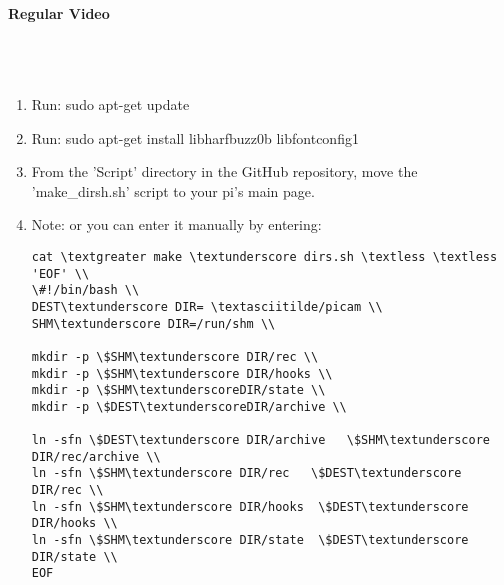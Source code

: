 \documentclass[onecolumn, draftclsnofoot,10pt, compsoc]{IEEEtran}
\begin{document}
\paragraph{Regular Video}\\
\\
\begin{enumerate}
\item  Run: sudo apt-get update
\item  Run: sudo apt-get install libharfbuzz0b libfontconfig1 
\item  From the 'Script' directory in the GitHub repository, move the 'make\_dirsh.sh' script to your pi's main page.
\item  Note: or you can enter it manually by entering: \\
\begin{lstlisting}
cat \textgreater make \textunderscore dirs.sh \textless \textless 'EOF' \\
\#!/bin/bash \\
DEST\textunderscore DIR= \textasciitilde/picam \\
SHM\textunderscore DIR=/run/shm \\

mkdir -p \$SHM\textunderscore DIR/rec \\
mkdir -p \$SHM\textunderscore DIR/hooks \\
mkdir -p \$SHM\textunderscoreDIR/state \\
mkdir -p \$DEST\textunderscoreDIR/archive \\

ln -sfn \$DEST\textunderscore DIR/archive   \$SHM\textunderscore DIR/rec/archive \\
ln -sfn \$SHM\textunderscore DIR/rec   \$DEST\textunderscore DIR/rec \\
ln -sfn \$SHM\textunderscore DIR/hooks  \$DEST\textunderscore DIR/hooks \\
ln -sfn \$SHM\textunderscore DIR/state  \$DEST\textunderscore DIR/state \\
EOF
\end{lstlisting}


\end{enumerate}
\end{document}
